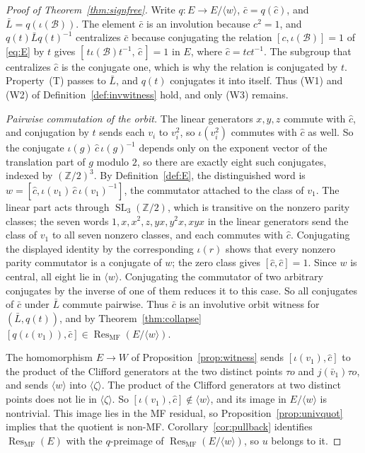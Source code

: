 \documentclass[11pt]{amsart}
\theoremstyle{definition}
\theoremstyle{remark}
\theoremstyle{plain}
\newcommand{\Z}{\mathbb Z}
\newcommand{\SL}{\operatorname{SL}}
\begin{document}
\begin{proof}[Proof of Theorem~\ref{thm:signfree}]
Write $q\colon E\to E/\langle w\rangle$, $\bar c=q(\hat c)$, and
$\bar L=q(\iota(\mathcal B))$.  The element $\bar c$ is an involution
because $c^2=1$, and $q(t)\bar Lq(t)^{-1}$ centralizes $\bar c$
because conjugating the relation $[c,\iota(\mathcal B)]=1$
of \eqref{eq:E} by $t$ gives
$[\,t\iota(\mathcal B)t^{-1},\,\hat c\,]=1$ in $E$, where $\hat c=tct^{-1}$.  The
subgroup that centralizes $\hat c$ is the conjugate one, which is why the
relation is conjugated by $t$.  Property~\textup{(T)} passes to $\bar L$,
and $q(t)$ conjugates it into itself.  Thus (W1) and (W2) of Definition~\ref{def:invwitness} hold, and only
(W3) remains.

\emph{Pairwise commutation of the orbit.}  The linear generators $x,y,z$
commute with $\hat c$, and conjugation by
$t$ sends each $v_i$ to $v_i^2$, so $\iota(v_i^2)$ commutes with $\hat c$
as well.  So the conjugate $\iota(g)\,\hat c\,\iota(g)^{-1}$
depends only on the exponent vector of the translation part of $g$
modulo $2$, so there are exactly eight such conjugates, indexed by
$(\Z/2)^3$.  By Definition~\ref{def:E}, the distinguished word is
$w=[\hat c,\iota(v_1)\,\hat c\,\iota(v_1)^{-1}]$, the commutator attached to
the class of $v_1$.  The linear part acts through
$\SL_3(\mathbb Z/2)$, which is transitive on the nonzero parity
classes; the seven words
$1,x,x^2,z,yx,y^2x,xyx$ in the linear generators send the class of $v_1$
to all seven nonzero classes, and each commutes with $\hat c$.
Conjugating the displayed identity by the corresponding $\iota(r)$
shows that every nonzero parity commutator is a conjugate of $w$; the
zero class gives $[\hat c,\hat c]=1$.  Since $w$ is central, all eight lie in
$\langle w\rangle$.  Conjugating the commutator of two arbitrary
conjugates by the inverse of one of them reduces it to this case.  So all conjugates of
$\bar c$ under $\bar L$ commute pairwise.  Thus $\bar c$ is an
involutive orbit witness for $(\bar L,q(t))$, and by
Theorem~\ref{thm:collapse}
$[q(\iota(v_1)),\bar c]\in
\operatorname{Res}_{\mathrm{MF}}(E/\langle w\rangle)$.

The homomorphism $E\to W$ of Proposition~\ref{prop:witness} sends
$[\iota(v_1),\hat c]$ to the
product of the Clifford generators at the two distinct points $\tau o$
and $j(\bar v_1)\tau o$, and sends $\langle w\rangle$ into
$\langle\zeta\rangle$.  The product of the Clifford generators at two
distinct points does not lie in $\langle\zeta\rangle$.  So
$[\iota(v_1),\hat c]\notin\langle w\rangle$, and its image in
$E/\langle w\rangle$ is nontrivial.  This image lies in the MF
residual, so Proposition~\ref{prop:univquot} implies that the quotient
is non-MF\@.
Corollary~\ref{cor:pullback} identifies
$\operatorname{Res}_{\mathrm{MF}}(E)$ with the $q$-preimage of
$\operatorname{Res}_{\mathrm{MF}}(E/\langle w\rangle)$, so $u$ belongs
to it.
\end{proof}
\end{document}
